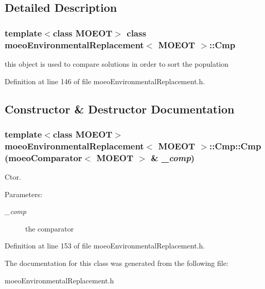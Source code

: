 \subsection{Detailed Description}
\subsubsection*{template$<$class MOEOT$>$ class moeo\-Environmental\-Replacement$<$ MOEOT $>$::Cmp}

this object is used to compare solutions in order to sort the population 



Definition at line 146 of file moeo\-Environmental\-Replacement.h.

\subsection{Constructor \& Destructor Documentation}
\subsubsection{\setlength{\rightskip}{0pt plus 5cm}template$<$class MOEOT$>$ \bf{moeo\-Environmental\-Replacement}$<$ MOEOT $>$::Cmp::Cmp (\bf{moeo\-Comparator}$<$ MOEOT $>$ \& {\em \_\-comp})\hspace{0.3cm}{\tt  [inline]}}\label{classmoeoEnvironmentalReplacement_1_1Cmp_efd55b365f306715f1a871b50d479f38}


Ctor. 

\begin{Desc}
\item[Parameters:]
\begin{description}
\item[{\em \_\-comp}]the comparator \end{description}
\end{Desc}


Definition at line 153 of file moeo\-Environmental\-Replacement.h.

The documentation for this class was generated from the following file:\begin{CompactItemize}
\item 
moeo\-Environmental\-Replacement.h\end{CompactItemize}
